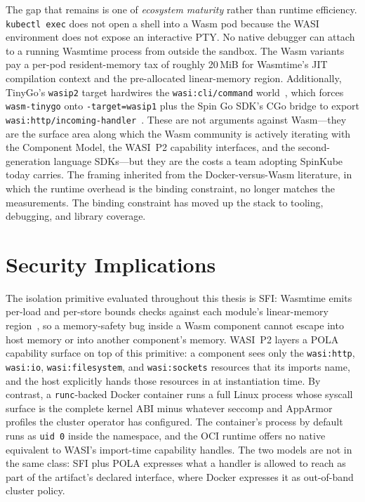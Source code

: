 \begin{sloppypar}
The gap that remains is one of \emph{ecosystem maturity} rather than runtime efficiency. \texttt{kubectl exec} does not open a shell into a \acs{Wasm} pod because the \acs{WASI} environment does not expose an interactive \acs{PTY}. No native debugger can attach to a running Wasmtime process from outside the sandbox. The \acs{Wasm} variants pay a per-pod resident-memory tax of roughly 20\,MiB for Wasmtime's \acs{JIT} compilation context and the pre-allocated linear-memory region. Additionally, TinyGo's \texttt{wasip2} target hardwires the \texttt{wasi:cli/command} world~\cite{tinygo2024, bytecodealliance2024componentmodel}, which forces \texttt{wasm-tinygo} onto \texttt{-target=wasip1} plus the Spin Go \acs{SDK}'s \acs{CGo} bridge to export \texttt{wasi:http/incoming-handler}~\cite{spinframework2024go}. These are not arguments against \acs{Wasm}---they are the surface area along which the \acs{Wasm} community is actively iterating with the Component Model, the \acs{WASI}~P2 capability interfaces, and the second-generation language \acs{SDK}s---but they are the costs a team adopting SpinKube today carries. The framing inherited from the Docker-versus-\acs{Wasm} literature, in which the runtime overhead is the binding constraint, no longer matches the measurements. The binding constraint has moved up the stack to tooling, debugging, and library coverage.
\end{sloppypar}

\section{Security Implications}
\label{sec:discussion_security}

\begin{sloppypar}
The isolation primitive evaluated throughout this thesis is \acf{SFI}: Wasmtime emits per-load and per-store bounds checks against each module's linear-memory region~\cite{bytecodealliance2024wasmtime, spies2021evaluation}, so a memory-safety bug inside a \acs{Wasm} component cannot escape into host memory or into another component's memory. \acs{WASI}~P2 layers a \acf{POLA} capability surface on top of this primitive: a component sees only the \texttt{wasi:http}, \texttt{wasi:io}, \texttt{wasi:filesystem}, and \texttt{wasi:sockets} resources that its imports name, and the host explicitly hands those resources in at instantiation time. By contrast, a \texttt{runc}-backed Docker container runs a full Linux process whose syscall surface is the complete kernel \acs{ABI} minus whatever seccomp and AppArmor profiles the cluster operator has configured. The container's process by default runs as \texttt{uid~0} inside the namespace, and the \acs{OCI} runtime offers no native equivalent to \acs{WASI}'s import-time capability handles. The two models are not in the same class: \acs{SFI} plus \acs{POLA} expresses what a handler is allowed to reach as part of the artifact's declared interface, where Docker expresses it as out-of-band cluster policy.
\end{sloppypar}

